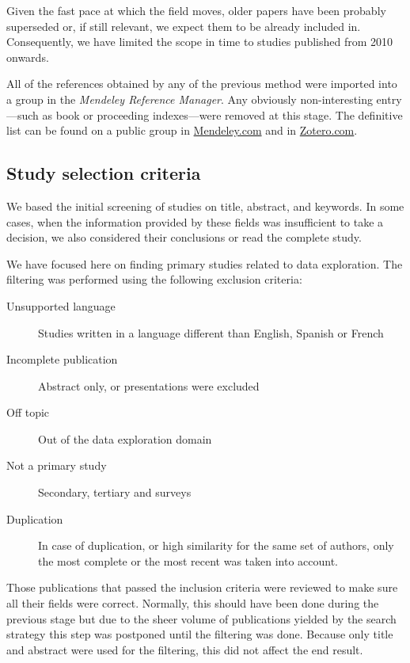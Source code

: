 Given the fast pace at which the field moves, older papers have been probably
superseded or, if still relevant, we expect them to be already included in\cite{Idreos2015}.
Consequently, we have limited the scope in time to studies published from 2010 onwards.

All of the references obtained by any of the previous method were imported into
a group in the \emph{Mendeley Reference Manager}. Any obviously non-interesting entry
---such as book or proceeding indexes---were removed at this stage.
The definitive list can be found on a public group in
\href{https://www.mendeley.com/community/interactive-data-exploration-in-science-systematic-mapping/}{Mendeley.com} and in
\href{https://www.zotero.org/groups/4517638/interactive-data-exploration-in-science-systematic-mapping/library}{Zotero.com}\footnotemark.


\subsection{Study selection criteria}
We based the initial screening of studies on title, abstract, and keywords.
In some cases, when the information provided by these fields was
insufficient to take a decision, we also considered their conclusions
or read the complete study.

We have focused here on finding primary studies related to data exploration.
The filtering was performed using the following exclusion criteria:

\begin{description}
  \item[Unsupported language] Studies written in a language different than
  English, Spanish or French
  \item[Incomplete publication] Abstract only, or presentations were excluded
  \item[Off topic] Out of the data exploration domain
  \item[Not a primary study] Secondary, tertiary and surveys
  \item[Duplication] In case of duplication, or high similarity for the same
  set of authors, only the most complete or the most recent was
  taken into account.
\end{description}

Those publications that passed the inclusion criteria were reviewed to make
sure all their fields were correct. Normally, this should have been done during
the previous stage but due to the sheer volume of publications yielded by the
search strategy this step was postponed until the filtering was done. Because only
title and abstract were used for the filtering, this did not affect the end
result.

